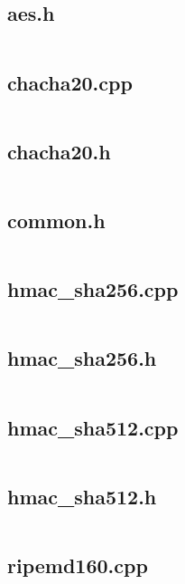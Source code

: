 \documentclass{article}
\begin{document}
\subsection{aes.h}
\inputminted{cpp}{/home/dufferzafar/dev/@clones/bitcoin/src/crypto/aes.h}
\newpage

\subsection{chacha20.cpp}
\inputminted{cpp}{/home/dufferzafar/dev/@clones/bitcoin/src/crypto/chacha20.cpp}
\newpage

\subsection{chacha20.h}
\inputminted{cpp}{/home/dufferzafar/dev/@clones/bitcoin/src/crypto/chacha20.h}
\newpage

\subsection{common.h}
\inputminted{cpp}{/home/dufferzafar/dev/@clones/bitcoin/src/crypto/common.h}
\newpage

\subsection{hmac\_sha256.cpp}
\inputminted{cpp}{/home/dufferzafar/dev/@clones/bitcoin/src/crypto/hmac_sha256.cpp}
\newpage

\subsection{hmac\_sha256.h}
\inputminted{cpp}{/home/dufferzafar/dev/@clones/bitcoin/src/crypto/hmac_sha256.h}
\newpage

\subsection{hmac\_sha512.cpp}
\inputminted{cpp}{/home/dufferzafar/dev/@clones/bitcoin/src/crypto/hmac_sha512.cpp}
\newpage

\subsection{hmac\_sha512.h}
\inputminted{cpp}{/home/dufferzafar/dev/@clones/bitcoin/src/crypto/hmac_sha512.h}
\newpage

\subsection{ripemd160.cpp}
\inputminted{cpp}{/home/dufferzafar/dev/@clones/bitcoin/src/crypto/ripemd160.cpp}
\newpage
\end{document}
